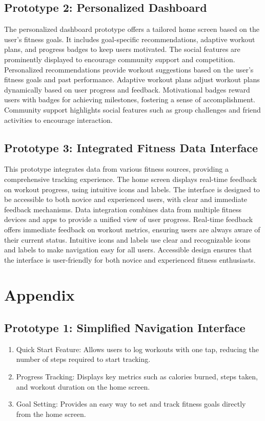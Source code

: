 \documentclass[
	letterpaper, %
]{jdf}
\begin{document}
\subsection {Prototype 2: Personalized Dashboard}
The personalized dashboard prototype offers a tailored home screen based on the user's fitness goals. It includes goal-specific recommendations, adaptive workout plans, and progress badges to keep users motivated. The social features are prominently displayed to encourage community support and competition. Personalized recommendations provide workout suggestions based on the user's fitness goals and past performance. Adaptive workout plans adjust workout plans dynamically based on user progress and feedback. Motivational badges reward users with badges for achieving milestones, fostering a sense of accomplishment. Community support highlights social features such as group challenges and friend activities to encourage interaction.

\subsection {Prototype 3: Integrated Fitness Data Interface}
This prototype integrates data from various fitness sources, providing a comprehensive tracking experience. The home screen displays real-time feedback on workout progress, using intuitive icons and labels. The interface is designed to be accessible to both novice and experienced users, with clear and immediate feedback mechanisms. Data integration combines data from multiple fitness devices and apps to provide a unified view of user progress. Real-time feedback offers immediate feedback on workout metrics, ensuring users are always aware of their current status. Intuitive icons and labels use clear and recognizable icons and labels to make navigation easy for all users. Accessible design ensures that the interface is user-friendly for both novice and experienced fitness enthusiasts.
\newpage
\section{Appendix}
\subsection{Prototype 1: Simplified Navigation Interface}
\begin{enumerate}
        \item Quick Start Feature: Allows users to log workouts with one tap, reducing the number of steps required to start tracking.
        \item Progress Tracking: Displays key metrics such as calories burned, steps taken, and workout duration on the home screen.
        \item Goal Setting: Provides an easy way to set and track fitness goals directly from the home screen.
\end{enumerate}
\end{document}
